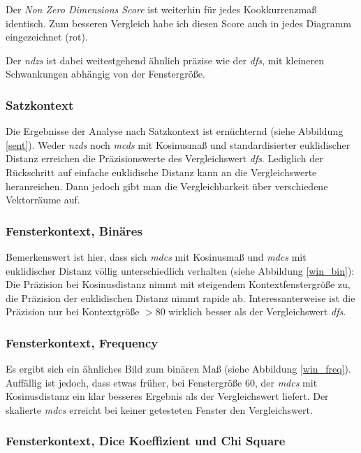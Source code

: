 \documentclass[11pt,numbers=noenddot]{scrartcl}
\begin{document}
Der \emph{Non Zero Dimensions Score} ist weiterhin für jedes Kookkurrenzmaß identisch. Zum besseren Vergleich habe ich diesen Score auch in jedes Diagramm eingezeichnet (rot).

Der \emph{ndzs} ist dabei weitestgehend ähnlich präzise wie der \emph{dfs}, mit kleineren Schwankungen abhängig von der Fenstergröße.

\subsubsection {Satzkontext}

Die Ergebnisse der Analyse nach Satzkontext ist ernüchternd (siehe Abbildung \ref{sent}). Weder \emph{nzds} noch \emph{mcds} mit Kosinusmaß und standardisierter euklidischer Distanz erreichen die Präzisionswerte des Vergleichswert \emph{dfs}. Lediglich der Rückschritt auf einfache euklidische Distanz kann an die Vergleichswerte heranreichen. Dann jedoch gibt man die Vergleichbarkeit über verschiedene Vektorräume auf.


\subsubsection{Fensterkontext, Binäres}

Bemerkenswert ist hier, dass sich \emph{mdcs} mit Kosinusmaß und \emph{mdcs} mit euklidischer Distanz völlig unterschiedlich verhalten (siehe Abbildung \ref{win_bin}): Die Präzision bei Kosinusdistanz nimmt mit steigendem Kontextfenstergröße zu, die Präzision der euklidischen Distanz nimmt rapide ab. Interessanterweise ist die Präzision nur bei Kontextgröße $>80$ wirklich besser als der Vergleichswert \emph{dfs}.


\subsubsection{Fensterkontext, Frequency}

Es ergibt sich ein ähnliches Bild zum binären Maß (siehe Abbildung \ref{win_freq}). Auffällig ist jedoch, dass etwas früher, bei Fenstergröße 60, der \emph{mdcs} mit Kosinusdistanz ein klar besseres Ergebnis als der Vergleichswert liefert. Der skalierte \emph{mdcs} erreicht bei keiner getesteten Fenster den Vergleichswert.

\subsubsection{Fensterkontext, Dice Koeffizient und Chi Square}
\end{document}
